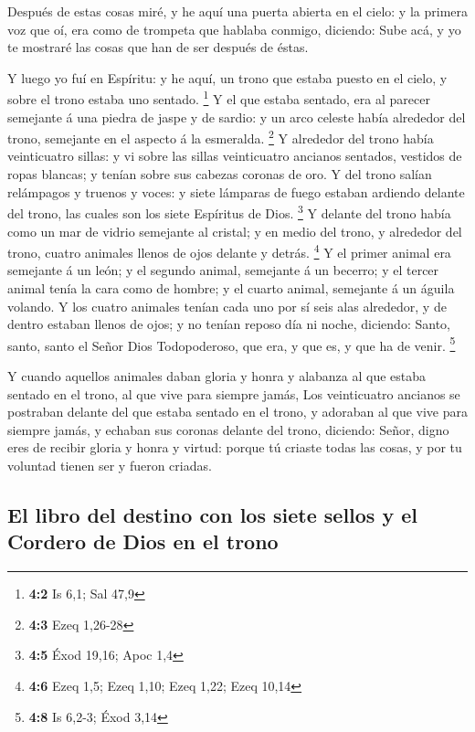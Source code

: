  Después de estas cosas miré, y he aquí una puerta abierta
en el cielo: y la primera voz que oí, era como de trompeta que hablaba
conmigo, diciendo: Sube acá, y yo te mostraré las cosas que han de ser
después de éstas.

 Y luego yo fuí en Espíritu: y he aquí, un trono que
estaba puesto en el cielo, y sobre el trono estaba uno sentado.
\footnote{\textbf{4:2} Is 6,1; Sal 47,9}  Y el que estaba
sentado, era al parecer semejante á una piedra de jaspe y de sardio: y
un arco celeste había alrededor del trono, semejante en el aspecto á la
esmeralda. \footnote{\textbf{4:3} Ezeq 1,26-28}  Y
alrededor del trono había veinticuatro sillas: y vi sobre las sillas
veinticuatro ancianos sentados, vestidos de ropas blancas; y tenían
sobre sus cabezas coronas de oro.  Y del trono salían
relámpagos y truenos y voces: y siete lámparas de fuego estaban ardiendo
delante del trono, las cuales son los siete Espíritus de Dios.
\footnote{\textbf{4:5} Éxod 19,16; Apoc 1,4}  Y delante
del trono había como un mar de vidrio semejante al cristal; y en medio
del trono, y alrededor del trono, cuatro animales llenos de ojos delante
y detrás. \footnote{\textbf{4:6} Ezeq 1,5; Ezeq 1,10; Ezeq 1,22; Ezeq
  10,14}  Y el primer animal era semejante á un león; y el
segundo animal, semejante á un becerro; y el tercer animal tenía la cara
como de hombre; y el cuarto animal, semejante á un águila volando.
 Y los cuatro animales tenían cada uno por sí seis alas
alrededor, y de dentro estaban llenos de ojos; y no tenían reposo día ni
noche, diciendo: Santo, santo, santo el Señor Dios Todopoderoso, que
era, y que es, y que ha de venir. \footnote{\textbf{4:8} Is 6,2-3; Éxod
  3,14}

 Y cuando aquellos animales daban gloria y honra y
alabanza al que estaba sentado en el trono, al que vive para siempre
jamás,  Los veinticuatro ancianos se postraban delante
del que estaba sentado en el trono, y adoraban al que vive para siempre
jamás, y echaban sus coronas delante del trono, diciendo:
 Señor, digno eres de recibir gloria y honra y virtud:
porque tú criaste todas las cosas, y por tu voluntad tienen ser y fueron
criadas.

\hypertarget{el-libro-del-destino-con-los-siete-sellos-y-el-cordero-de-dios-en-el-trono}{%
\subsection{El libro del destino con los siete sellos y el Cordero de
Dios en el
trono}\label{el-libro-del-destino-con-los-siete-sellos-y-el-cordero-de-dios-en-el-trono}}

